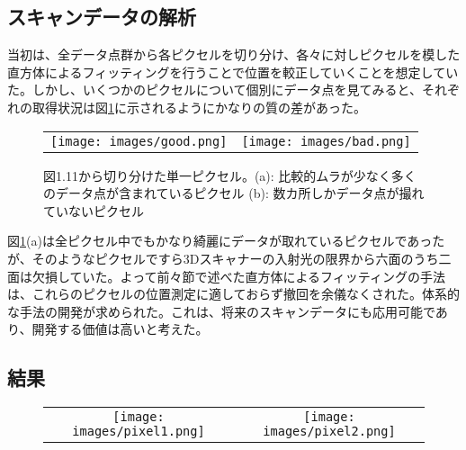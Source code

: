 \documentclass[Yonemoto_master.tex]{subfiles}
\begin{document}
\subsection{スキャンデータの解析}

  当初は、全データ点群から各ピクセルを切り分け、各々に対しピクセルを模した直方体によるフィッティングを行うことで位置を較正していくことを想定していた。しかし、いくつかのピクセルについて個別にデータ点を見てみると、それぞれの取得状況は図\ref{fig: good_bad}に示されるようにかなりの質の差があった。

\begin{figure}[h]
    \begin{tabular}{cc}
      \begin{minipage}[t]{0.45\hsize}
        \centering
        \texttt{[image: images/good.png]}
        \caption*{(a)}
      \end{minipage} &
      \begin{minipage}[t]{0.45\hsize}
        \centering
        \texttt{[image: images/bad.png]}
         \caption*{(b)}
      \end{minipage}
    \end{tabular}
    \caption{図1.11から切り分けた単一ピクセル。(a): 比較的ムラが少なく多くのデータ点が含まれているピクセル (b): 数カ所しかデータ点が撮れていないピクセル}
    \label{fig: good_bad}
  \end{figure}

図\ref{fig: good_bad}(a)は全ピクセル中でもかなり綺麗にデータが取れているピクセルであったが、そのようなピクセルですら3Dスキャナーの入射光の限界から六面のうち二面は欠損していた。よって前々節で述べた直方体によるフィッティングの手法は、これらのピクセルの位置測定に適しておらず撤回を余儀なくされた。体系的な手法の開発が求められた。これは、将来のスキャンデータにも応用可能であり、開発する価値は高いと考えた。

\subsection{結果}
\begin{figure}[h]
    \begin{tabular}{cc}
      \begin{minipage}[t]{0.45\hsize}
        \centering
        \texttt{[image: images/pixel1.png]}
      \end{minipage} &
      \begin{minipage}[t]{0.45\hsize}
        \centering
        \texttt{[image: images/pixel2.png]}
      \end{minipage}
    \end{tabular}
    \caption{}
    \label{fig: scan_pixel}
  \end{figure}
\end{document}
